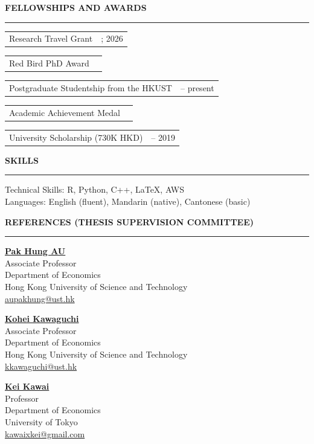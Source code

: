 \documentclass[11pt,letterpaper]{article}
\makeatletter
\newlength{\cvdatecol}
\newcommand{\sectionheader}[1]{%
  \vspace{0.55em}
  {\large\bfseries #1}\\[-0.15em]
  \rule{\textwidth}{0.4pt}\par
  \vspace{0.25em}
}
\newcommand{\cvline}[3][0em]{%
  \par\nobreak
  \noindent\hspace*{#1}%
  \begin{tabularx}{\dimexpr\textwidth-#1\relax}{@{}X@{\hspace{0.75em}}>{\raggedleft\arraybackslash}p{\cvdatecol}@{}}
  #2 & #3 \\
  \end{tabularx}%
}
\makeatother
\begin{document}
\sectionheader{FELLOWSHIPS AND AWARDS}
{
\cvline[1.5em]{Research Travel Grant}{2023; 2026}
\vspace{-0.12em}
\cvline[1.5em]{Red Bird PhD Award}{2022}
\vspace{-0.12em}
\cvline[1.5em]{Postgraduate Studentship from the HKUST}{2020 -- present}
\vspace{-0.12em}
\cvline[1.5em]{Academic Achievement Medal}{2019}
\vspace{-0.12em}
\cvline[1.5em]{University Scholarship (730K HKD)}{2015 -- 2019}
}

\sectionheader{SKILLS}
Technical Skills: R, Python, C++, \LaTeX, AWS\\
Languages: English (fluent), Mandarin (native), Cantonese (basic)

\sectionheader{REFERENCES (THESIS SUPERVISION COMMITTEE)}
{
\noindent
\begin{minipage}[t]{0.48\textwidth}
\textbf{\href{https://aupakhung.weebly.com/}{Pak Hung AU}}\\
Associate Professor\\
Department of Economics\\
Hong Kong University of Science and Technology\\
\href{mailto:aupakhung@ust.hk}{aupakhung@ust.hk}
\end{minipage}\hfill
\begin{minipage}[t]{0.48\textwidth}
\textbf{\href{https://www.kohei-kawaguchi.com/}{Kohei Kawaguchi}}\\
Associate Professor\\
Department of Economics\\
Hong Kong University of Science and Technology\\
\href{mailto:kkawaguchi@ust.hk}{kkawaguchi@ust.hk}
\end{minipage}

\vspace{1.0em}
\noindent
\begin{minipage}[t]{0.48\textwidth}
\textbf{\href{https://www.e.u-tokyo.ac.jp/fservice/faculty/kawai/kawai-e/kawai01-e.html}{Kei Kawai}}\\
Professor\\
Department of Economics\\
University of Tokyo\\
\href{mailto:kawaixkei@gmail.com}{kawaixkei@gmail.com}
\end{minipage}
}
\end{document}
